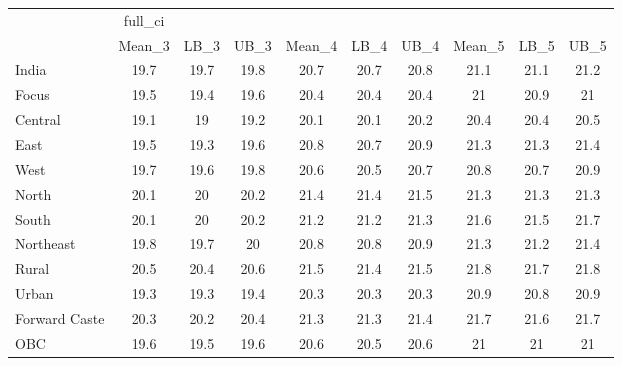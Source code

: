 \begin{tabular}{l*{9}{c}}
\toprule
                    &     full\_ci&            &            &            &            &            &            &            &            \\
                    &      Mean\_3&        LB\_3&        UB\_3&      Mean\_4&        LB\_4&        UB\_4&      Mean\_5&        LB\_5&        UB\_5\\
\midrule
India               &        19.7&        19.7&        19.8&        20.7&        20.7&        20.8&        21.1&        21.1&        21.2\\
Focus               &        19.5&        19.4&        19.6&        20.4&        20.4&        20.4&          21&        20.9&          21\\
Central             &        19.1&          19&        19.2&        20.1&        20.1&        20.2&        20.4&        20.4&        20.5\\
East                &        19.5&        19.3&        19.6&        20.8&        20.7&        20.9&        21.3&        21.3&        21.4\\
West                &        19.7&        19.6&        19.8&        20.6&        20.5&        20.7&        20.8&        20.7&        20.9\\
North               &        20.1&          20&        20.2&        21.4&        21.4&        21.5&        21.3&        21.3&        21.3\\
South               &        20.1&          20&        20.2&        21.2&        21.2&        21.3&        21.6&        21.5&        21.7\\
Northeast           &        19.8&        19.7&          20&        20.8&        20.8&        20.9&        21.3&        21.2&        21.4\\
Rural               &        20.5&        20.4&        20.6&        21.5&        21.4&        21.5&        21.8&        21.7&        21.8\\
Urban               &        19.3&        19.3&        19.4&        20.3&        20.3&        20.3&        20.9&        20.8&        20.9\\
Forward Caste       &        20.3&        20.2&        20.4&        21.3&        21.3&        21.4&        21.7&        21.6&        21.7\\
OBC                 &        19.6&        19.5&        19.6&        20.6&        20.5&        20.6&          21&          21&          21\\

\end{tabular}
